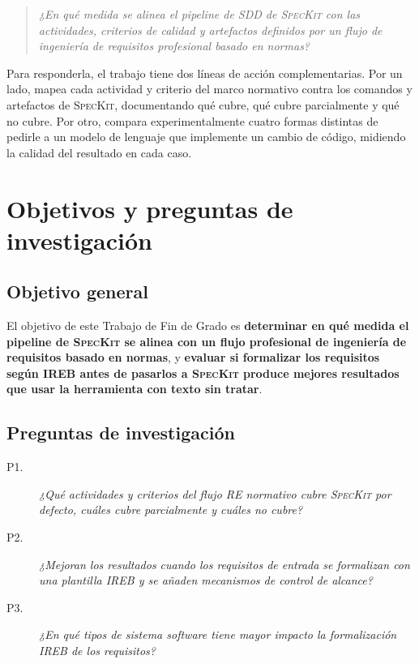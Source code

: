 \begin{quote}
\emph{¿En qu\'e medida se alinea el pipeline de SDD de \textsc{SpecKit} con las actividades, criterios de calidad y artefactos definidos por un flujo de ingenier\'ia de requisitos profesional basado en normas?}
\end{quote}

Para responderla, el trabajo tiene dos l\'ineas de acci\'on complementarias. Por un lado, mapea cada actividad y criterio del marco normativo contra los comandos y artefactos de \textsc{SpecKit}, documentando qu\'e cubre, qu\'e cubre parcialmente y qu\'e no cubre. Por otro, compara experimentalmente cuatro formas distintas de pedirle a un modelo de lenguaje que implemente un cambio de c\'odigo, midiendo la calidad del resultado en cada caso.

\section{Objetivos y preguntas de investigaci\'on}

\subsection{Objetivo general}

El objetivo de este Trabajo de Fin de Grado es \textbf{determinar en qu\'e medida el pipeline de \textsc{SpecKit} se alinea con un flujo profesional de ingenier\'ia de requisitos basado en normas}, y \textbf{evaluar si formalizar los requisitos seg\'un IREB antes de pasarlos a \textsc{SpecKit} produce mejores resultados que usar la herramienta con texto sin tratar}.

\subsection{Preguntas de investigaci\'on}

\begin{description}
    \item[P1.] \textit{¿Qu\'e actividades y criterios del flujo RE normativo cubre \textsc{SpecKit} por defecto, cu\'ales cubre parcialmente y cu\'ales no cubre?}
    
    \item[P2.] \textit{¿Mejoran los resultados cuando los requisitos de entrada se formalizan con una plantilla IREB y se a\~naden mecanismos de control de alcance?}

    \item[P3.] \textit{¿En qu\'e tipos de sistema software tiene mayor impacto la formalizaci\'on IREB de los requisitos?}
\end{description}

